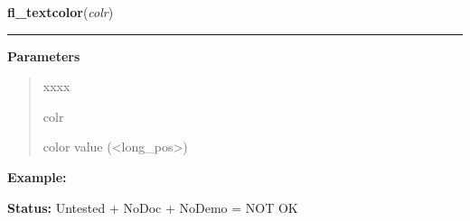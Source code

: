     \label{xformslib:library:fl_textcolor}

    \vspace{0.5ex}

\hspace{.8\funcindent}\begin{boxedminipage}{\funcwidth}

    \raggedright \textbf{fl\_textcolor}(\textit{colr})

    \vspace{-1.5ex}

    \rule{\textwidth}{0.5\fboxrule}
\setlength{\parskip}{2ex}
\setlength{\parskip}{1ex}
      \textbf{Parameters}
      \vspace{-1ex}

      \begin{quote}
        \begin{Ventry}{xxxx}

          \item[colr]

          color value ({\textless}long\_pos{\textgreater})

        \end{Ventry}

      \end{quote}

\textbf{Example:} 

\textbf{Status:} Untested + NoDoc + NoDemo = NOT OK



    \end{boxedminipage}

    \label{xformslib:library:fl_bk_textcolor}

    \vspace{0.5ex}

